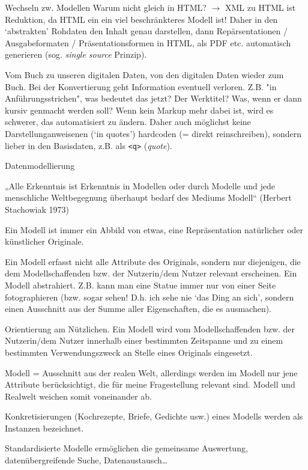 \begin{frame}[allowframebreaks]{Wechseln zw. Modellen}
 Warum nicht gleich in HTML? $\to$ XML zu HTML ist Reduktion, da HTML ein ein viel beschränkteres Modell ist! Daher in den  `abstrakten' Rohdaten den Inhalt genau  darstellen, dann Repärsentationen / Ausgabeformaten / Präsentationsformen in HTML, als PDF etc. automatisch generieren (sog. \emph{single source} Prinzip).

Vom Buch zu unseren digitalen Daten, von den digitalen Daten wieder zum Buch.
Bei der Konvertierung geht Information eventuell verloren. Z.B. "in Anführungsstrichen", was bedeutet das jetzt? Der Werktitel? Was, wenn er dann kursiv genmacht werden soll? Wenn kein Markup mehr dabei ist, wird es schwerer, das automatisiert zu ändern. Daher auch möglichst keine Darstellunganweisenen (`in quotes') hardcoden (= direkt reinschreiben), sondern lieber in den Basisdaten, z.B. als \texttt{<q>} (\emph{quote}).
\end{frame}

\begin{frame}[allowframebreaks]{Datenmodellierung}

„Alle Erkenntnis ist Erkenntnis in Modellen oder durch Modelle und jede
menschliche Weltbegegnung überhaupt bedarf des Mediums Modell“ (Herbert Stachowiak 1973)
\smallskip

Ein Modell ist immer ein Abbild von etwas, eine Repräsentation
natürlicher oder künstlicher Originale.
\smallskip

Ein Modell erfasst nicht alle Attribute des Originals, sondern nur
diejenigen, die dem Modellschaffenden bzw. der Nutzerin/dem Nutzer
relevant erscheinen. Ein Modell abstrahiert. Z.B. kann man eine Statue immer nur von einer Seite fotographieren (bzw. sogar sehen! D.h. ich sehe nie `das Ding an sich', sondern einen Ausschnitt aus der Summe aller Eigenschaften, die es ausmachen).
\smallskip

Orientierung am Nützlichen. Ein Modell wird vom Modellschaffenden
bzw. der Nutzerin/dem Nutzer innerhalb einer bestimmten Zeitspanne
und zu einem bestimmten Verwendungszweck an Stelle eines Originals
eingesetzt.
\smallskip

Modell =  Ausschnitt aus der realen Welt, allerdings
werden im Modell nur jene Attribute berücksichtigt, die für
meine Fragestellung relevant sind.
 Modell und Realwelt weichen somit voneinander ab.
\smallskip

Konkretisierungen (Kochrezepte, Briefe, Gedichte usw.) eines
Modells werden als Instanzen bezeichnet.
\smallskip

Standardisierte Modelle ermöglichen die gemeinsame
Auswertung, datenübergreifende Suche, Datenaustausch\dots
\smallskip


\end{frame}

